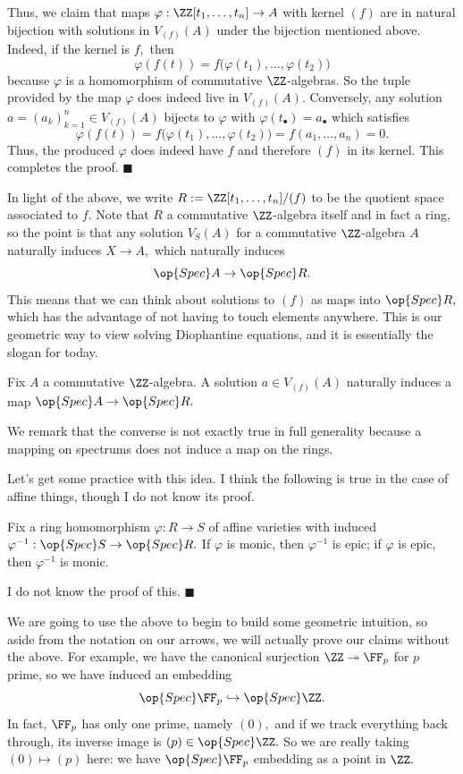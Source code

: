 Thus, we claim that maps $\varphi:\ZZ[t_1,\ldots,t_n]\to A$ with kernel $(f)$ are in natural bijection with solutions in $V_{(f)}(A)$ under the bijection mentioned above. Indeed, if the kernel is $f,$ then
\[\varphi(f(t))=f\big(\varphi(t_1),\ldots,\varphi(t_2)\big)\]
because $\varphi$ is a homomorphism of commutative $\ZZ$-algebras. So the tuple provided by the map $\varphi$ does indeed live in $V_{(f)}(A).$ Conversely, any solution $a=(a_k)_{k=1}^n\in V_{(f)}(A)$ bijects to $\varphi$ with $\varphi(t_\bullet)=a_\bullet$ which satisfies
\[\varphi(f(t))=f\big(\varphi(t_1),\ldots,\varphi(t_2)\big)=f(a_1,\ldots,a_n)=0.\]
Thus, the produced $\varphi$ does indeed have $f$ and therefore $(f)$ in its kernel. This completes the proof. $\blacksquare$

In light of the above, we write $R:=\ZZ[t_1,\ldots,t_n]/(f)$ to be the quotient space associated to $f.$ Note that $R$ a commutative $\ZZ$-algebra itself and in fact a ring, so the point is that any solution $V_S(A)$ for a commutative $\ZZ$-algebra $A$ naturally induces $X\to A,$ which naturally induces
\[\op{Spec}A\to\op{Spec}R.\]
This means that we can think about solutions to $(f)$ as maps into $\op{Spec}R,$ which has the advantage of not having to touch elements anywhere. This is our geometric way to view solving Diophantine equations, and it is essentially the slogan for today.
\begin{idea}
    Fix $A$ a commutative $\ZZ$-algebra. A solution $a\in V_{(f)}(A)$ naturally induces a map $\op{Spec}A\to\op{Spec}R.$
\end{idea}
We remark that the converse is not exactly true in full generality because a mapping on spectrums does not induce a map on the rings.

Let's get some practice with this idea. I think the following is true in the case of affine things, though I do not know its proof.
\begin{lemma}
    Fix a ring homomorphism $\varphi:R\to S$ of affine varieties with induced $\varphi^{-1}:\op{Spec}S\to\op{Spec}R.$ If $\varphi$ is monic, then $\varphi^{-1}$ is epic; if $\varphi$ is epic, then $\varphi^{-1}$ is monic.
\end{lemma}
I do not know the proof of this. $\blacksquare$

We are going to use the above to begin to build some geometric intuition, so aside from the notation on our arrows, we will actually prove our claims without the above. For example, we have the canonical surjection $\ZZ\twoheadrightarrow\FF_p$ for $p$ prime, so we have induced an embedding
\[\op{Spec}\FF_p\hookrightarrow\op{Spec}\ZZ.\]
In fact, $\FF_p$ has only one prime, namely $(0),$ and if we track everything back through, its inverse image is $(p)\in\op{Spec}\ZZ.$ So we are really taking $(0)\mapsto(p)$ here: we have $\op{Spec}\FF_p$ embedding as a point in $\ZZ.$


